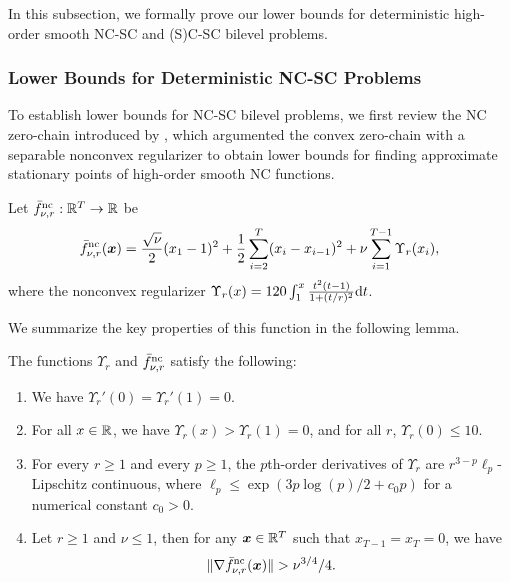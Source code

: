 \documentclass{article}
\begin{document}
In this subsection, we formally prove our lower bounds for deterministic high-order smooth NC-SC 
and (S)C-SC bilevel problems.

\subsubsection{Lower Bounds for Deterministic NC-SC Problems} \label{subsec:lb-det-nc}


To establish lower bounds for NC-SC bilevel problems, we first review the NC zero-chain introduced by \citet{carmon2021lower}, which 
argumented the convex zero-chain \citep{nesterov2018lectures}
with a separable nonconvex regularizer to obtain lower bounds for finding approximate stationary points of high-order smooth NC functions.

\begin{dfn} \label{dfn:nc-zo-chain}
Let $\bar f_{\nu,r}^{\rm nc}: {\mathbb{R}}^{T}\rightarrow {\mathbb{R}}$ be
\begin{align*}
    \bar f_{\nu, r}^{\rm nc}({\bm{x}}) = \frac{\sqrt{\nu}}{2} (x_1 - 1)^2 + \frac{1}{2} \sum_{i=2}^T (x_{i}-  x_{i-1})^2
    + \nu \sum_{i=1}^{T-1} \Upsilon_r(x_i),
\end{align*}
where the nonconvex regularizer $\Upsilon_r(x) = 120 \int_1^x \frac{t^2 (t-1)}{1+(t/r)^2} {\rm d}t$.
\end{dfn}

We summarize the key properties of this function in the following lemma.


\begin{lem} \label{lem:Car-Upsion}
 The functions $\Upsilon_r$ and $\bar f_{\nu,r}^{\rm nc}$ 
 satisfy the following:
 \begin{enumerate}
 \item We have $\Upsilon_r'(0) = \Upsilon_r'(1) = 0$.
 \item For all $x \in {\mathbb{R}}$, we have $\Upsilon_r(x) > \Upsilon_r(1) = 0$, and for all $r$, $\Upsilon_r(0) \le 10$.
    \item For every $r \ge 1$ and every $p \ge 1$, the $p$th-order derivatives of $\Upsilon_r$ are $r^{3-p}\ell_p$-Lipschitz continuous, where $\ell_p \le \exp(3p \log(p)/2 + c_0p)$ for a numerical constant $c_0>0$.
\item  Let $r \ge 1$ and $\nu \le 1$, then for any ${\bm{x}} \in {\mathbb{R}}^T$ such that $x_{T-1} = x_{T}= 0$, we have 
\begin{align*}
    \Vert \nabla \bar f^{\rm nc}_{\nu, r}({\bm{x}}) \Vert > \nu^{3/4} / 4.
\end{align*}
 \end{enumerate}
\end{lem}
\end{document}
